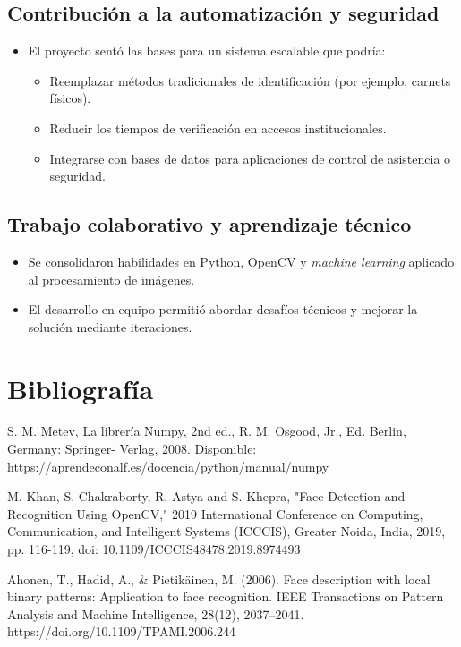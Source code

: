 \documentclass[12pt]{article}
\begin{document}
{\subsection*{Contribución a la automatización y seguridad}
\begin{itemize}
    \item El proyecto sentó las bases para un sistema escalable que podría:
    \begin{itemize}
        \item Reemplazar métodos tradicionales de identificación (por ejemplo, carnets físicos).
        \item Reducir los tiempos de verificación en accesos institucionales.
        \item Integrarse con bases de datos para aplicaciones de control de asistencia o seguridad.
    \end{itemize}
\end{itemize}

\subsection*{Trabajo colaborativo y aprendizaje técnico}
\begin{itemize}
    \item Se consolidaron habilidades en Python, OpenCV y \textit{machine learning} aplicado al procesamiento de imágenes.
    \item El desarrollo en equipo permitió abordar desafíos técnicos y mejorar la solución mediante iteraciones.
\end{itemize}

\section{Bibliografía}
S. M. Metev, La librería Numpy, 2nd ed., R. M. Osgood, Jr., Ed. Berlin, Germany: Springer- Verlag, 2008. Disponible: https://aprendeconalf.es/docencia/python/manual/numpy 


M. Khan, S. Chakraborty, R. Astya and S. Khepra, "Face Detection and Recognition Using OpenCV," 2019 International Conference on Computing, Communication, and Intelligent Systems (ICCCIS), Greater Noida, India, 2019, pp. 116-119, doi: 10.1109/ICCCIS48478.2019.8974493


Ahonen, T., Hadid, A., \& Pietikäinen, M. (2006). Face description with local binary patterns: Application to face recognition. IEEE Transactions on Pattern Analysis and Machine Intelligence, 28(12), 2037–2041. https://doi.org/10.1109/TPAMI.2006.244


}
\end{document}
